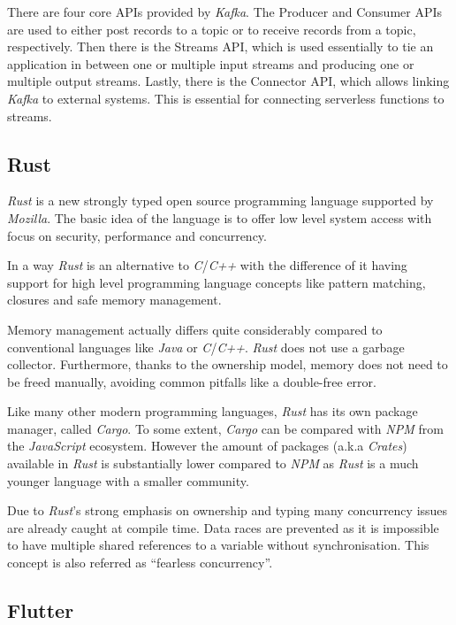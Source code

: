 There are four core APIs provided by \textit{Kafka}. The Producer and Consumer APIs are used to
either post records to a topic or to receive records from a topic, respectively. Then there is the
Streams API, which is used essentially to tie an application in between one or multiple input
streams and producing one or multiple output streams. Lastly, there is the Connector API, which
allows linking \textit{Kafka} to external systems. This is essential for connecting serverless
functions to streams.
\cite{kafka-introduction}

\subsection{Rust}

\textit{Rust} is a new strongly typed open source programming language supported by
\textit{Mozilla}. The basic idea of the language is to offer low level system access with focus on
security, performance and concurrency. \cite{rustbook1, forkjoin}

In a way \textit{Rust} is an alternative to \textit{C}/\textit{C++} with the difference of it having
support for high level programming language concepts like pattern matching, closures and safe memory
management. \cite{rustbook1, forkjoin}

Memory management actually differs quite considerably compared to conventional languages like
\textit{Java} or \textit{C}/\textit{C++}. \textit{Rust} does not use a garbage collector.
Furthermore, thanks to the ownership model, memory does not need to be freed manually, avoiding
common pitfalls like a double-free error.

Like many other modern programming languages, \textit{Rust} has its own package manager, called
\textit{Cargo}. To some extent, \textit{Cargo} can be compared with \textit{NPM} from the
\textit{JavaScript} ecosystem. However the amount of packages (a.k.a \textit{Crates}) available in
\textit{Rust} is substantially lower compared to \textit{NPM} as \textit{Rust} is a much younger
language with a smaller community.

Due to \textit{Rust}'s strong emphasis on ownership and typing many concurrency issues are already
caught at compile time. Data races are prevented as it is impossible to have multiple shared
references to a variable without synchronisation. This concept is also referred as “fearless
concurrency”. \cite{rustbook2}

\subsection{Flutter}

